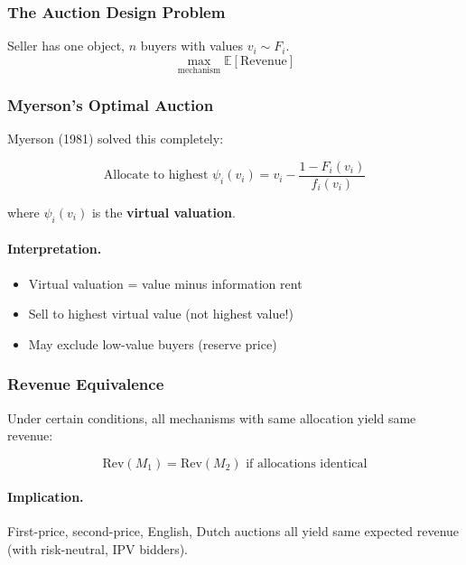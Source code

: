 \subsubsection{The Auction Design Problem}

Seller has one object, $n$ buyers with values $v_i \sim F_i$.
\begin{equation}
\max_{\text{mechanism}} \mathbb{E}[\text{Revenue}]
\end{equation}

\subsubsection{Myerson's Optimal Auction}

Myerson (1981) solved this completely:

\begin{equation}
\boxed{
\text{Allocate to highest } \psi_i(v_i) = v_i - \frac{1 - F_i(v_i)}{f_i(v_i)}
}
\label{eq:myerson-auction}
\end{equation}

where $\psi_i(v_i)$ is the \textbf{virtual valuation}.

\paragraph{Interpretation.}
\begin{itemize}
    \item Virtual valuation = value minus information rent
    \item Sell to highest virtual value (not highest value!)
    \item May exclude low-value buyers (reserve price)
\end{itemize}

\subsubsection{Revenue Equivalence}

Under certain conditions, all mechanisms with same allocation yield same revenue:

\begin{equation}
\boxed{
\text{Rev}(M_1) = \text{Rev}(M_2) \text{ if allocations identical}
}
\label{eq:revenue-equivalence}
\end{equation}

\paragraph{Implication.}
First-price, second-price, English, Dutch auctions all yield same expected 
revenue (with risk-neutral, IPV bidders).


